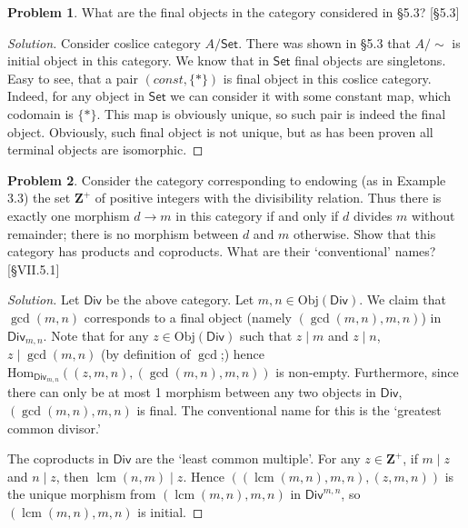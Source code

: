 \documentclass[fontsize=14pt]{scrartcl}
\DeclareMathOperator{\lcm}{lcm}
\theoremstyle{definition}
\newtheorem{problem-internal}{Problem}[subsection]
\newenvironment{problem}{
  \medskip
  \begin{problem-internal}
}{
  \end{problem-internal}
}
\newenvironment{solution}{
  \begin{proof}[Solution]
  \vspace{-8px}
  \setlength{\parskip}{4px}
  \setlength{\parindent}{0px}
}{
  \end{proof}
}
\newcommand{\Obj}{\mathrm{Obj}}
\newcommand{\Hom}{\mathrm{Hom}}
\begin{document}
\begin{problem}
What are the final objects in the category considered in \S5.3? [\S5.3]
\end{problem}
\begin{solution}
Consider coslice category $A/\mathsf{Set}$. There was shown in \S 5.3 that $A/\sim$ is 
initial object in this category. We know that in $\mathsf{Set}$ final objects are singletons.
Easy to see, that a pair $(const, \{*\})$ is final object in this coslice category. Indeed, 
for any object in $\mathsf{Set}$ we can consider it with some constant map, which codomain is
$\{*\}$. This map is obviously unique, so such pair is indeed the final object. Obviously, 
such final object is not unique, but as has been proven all terminal objects are isomorphic.
\end{solution}


\begin{problem}
  Consider the category corresponding to endowing (as in Example 3.3) the set
  $\mathbf{Z}^+$ of positive integers with the divisibility relation. Thus there
  is exactly one morphism $d\to m$ in this category if and only if $d$ divides $m$
  without remainder; there is no morphism between $d$ and $m$ otherwise. Show that
  this category has products and coproducts. What are their `conventional' names?
  [\S VII.5.1]
  \end{problem}
  \begin{solution}
  \def \Div {\mathsf{Div}}
  Let $\Div$ be the above category. Let $m,n\in\Obj(\Div)$. We claim that
  $\gcd(m,n)$ corresponds to a final object (namely $(\gcd(m,n),m,n)$) in
  $\Div_{m,n}$. Note that for any $z\in\Obj(\Div)$ such that $z\mid m$ and $z\mid
  n$, $z\mid\gcd(m,n)$ (by definition of $\gcd$;) hence
  $\Hom_{\Div_{m,n}}((z,m,n),(\gcd(m,n),m,n))$ is non-empty. Furthermore, since
  there can only be at most 1 morphism between any two objects in $\Div$,
  $(\gcd(m,n),m,n)$ is final. The conventional name for this is the `greatest
  common divisor.'
  
  The coproducts in $\Div$ are the `least common multiple'. For any
  $z\in\mathbf{Z}^+$, if $m\mid z$ and $n\mid z$, then $\lcm(n,m)\mid z$. Hence
  $((\lcm(m,n),m,n),(z,m,n))$ is the unique morphism from $(\lcm(m,n),m,n)$ in
  $\Div^{m,n}$, so $(\lcm(m,n),m,n)$ is initial.
  \end{solution}
\end{document}
